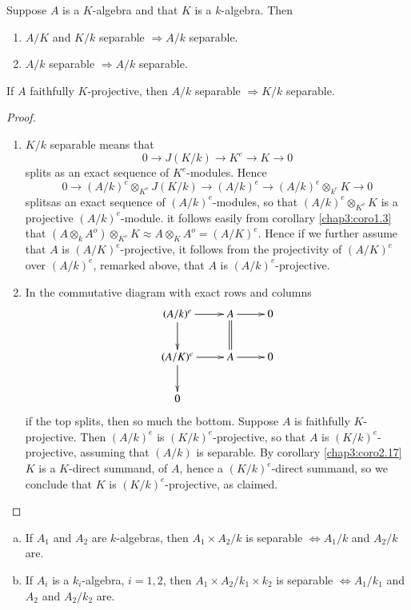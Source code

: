     \begin{prop}\label{chap3:prop2.19} %
Suppose $A$ is a $K$-algebra and that $K$ is a $k$-algebra. Then
\begin{enumerate}[(1)]
\item $A/K$ and $K/k$ separable $\Rightarrow A/k$ separable. 

\item $A/k$ separable $\Rightarrow A/k$ separable.
\end{enumerate}

If $A$ faithfully $K$-projective, then $A/k$ separable $\Rightarrow
K/k$ separable. 
    \end{prop}    

    \begin{proof}%
\begin{enumerate}[(1)]
\item $K/ k$ separable means that 
$$
0 \to J (K /k) \to  K^e \to K \to 0
$$
splits as an exact sequence of $K^e$-modules. Hence
$$
0 \to (A/k)^e \otimes_{K^e} J(K/k) \to (A/k)^e \to (A/k)^e
\otimes_{k^{e}} K  \to 0 
$$
splits\pageoriginale as an exact sequence of $(A/k)^e$-modules, so that
$(A/k)^e 
\otimes_{K^e}K$ is a projective $(A/k)^e$-module. it follows easily
from corollary \ref{chap3:coro1.3} that $(A \otimes_k A^o)
\otimes_{K^e} K \approx 
A \otimes_K A^o = (A/ K)^e$. Hence if we further assume that $A$ is
$(A/K)^e$-projective, it follows from the projectivity of $(A/K)^e$
over $(A/k)^e$, remarked above, that $A$ is $(A/k)^e$-projective. 

\item In the commutative diagram with exact rows and columns 
\[
\xymatrix{
(A/k)^e \ar[r] \ar[d] & A \ar[r] \ar@{=}[d] & 0 \\
(A/K)^e \ar[r] \ar[d] & A \ar[r] & 0\\
0 & & 
}
\]
if the top splits, then so much the bottom. Suppose $A$ is faithfully
$K$-projective. Then $(A/k)^e$ is $(K/k)^e$-projective, so that $A$ is
$(K/k)^e$-projective, assuming that $(A/k)$ is separable. By corollary
\ref{chap3:coro2.17} $K$ is a $K$-direct summand, of $A$, hence a
$(K/k)^e$-direct 
summand, so we conclude that $K$ is $(K/k)^e$-projective, as claimed. 
\end{enumerate}
    \end{proof}    

    \begin{prop}\label{chap3:prop2.20} %
\begin{enumerate}[(a)]
\item If  $A_1$ and $A_2$ are $k$-algebras, then $A_1 \times A_2 /k$
  is separable $\Leftrightarrow A_1 / k$ and $A_2 /k$ are. 

\item If $A_i$ is a $k_i$-algebra, $i=1, 2$, then $A_1 \times A_2 /
  k_1 \times k_2$ is separable $\Leftrightarrow A_1 / k_1$ and $A_2$
  and $A_2 / k_2$ are. 
\end{enumerate}
    \end{prop}  


